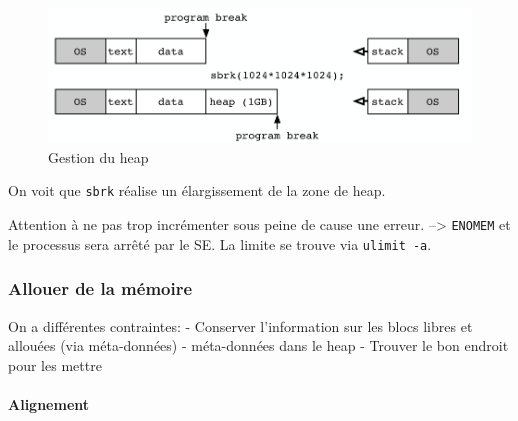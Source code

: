 \begin{figure}
\centering
\includegraphics{image-48.png}
\caption{Gestion du heap}
\end{figure}

On voit que \texttt{sbrk} réalise un élargissement de la zone de heap.

\begin{Shaded}
\begin{Highlighting}[]
\PreprocessorTok{ }

\OperatorTok{(} \OperatorTok{*}\OperatorTok{);}            
 \OperatorTok{*}\OperatorTok{(}\OperatorTok{);} 
\end{Highlighting}
\end{Shaded}

Attention à ne pas trop incrémenter sous peine de cause une erreur.
--\textgreater{} \texttt{ENOMEM} et le processus sera arrêté par le SE.
La limite se trouve via \texttt{ulimit\ -a}.

\subsubsection{Allouer de la mémoire}\label{allouer-de-la-muxe9moire}

On a différentes contraintes: - Conserver l'information sur les blocs
libres et allouées (via méta-données) - méta-données dans le heap -
Trouver le bon endroit pour les mettre

\paragraph{Alignement}\label{alignement}

